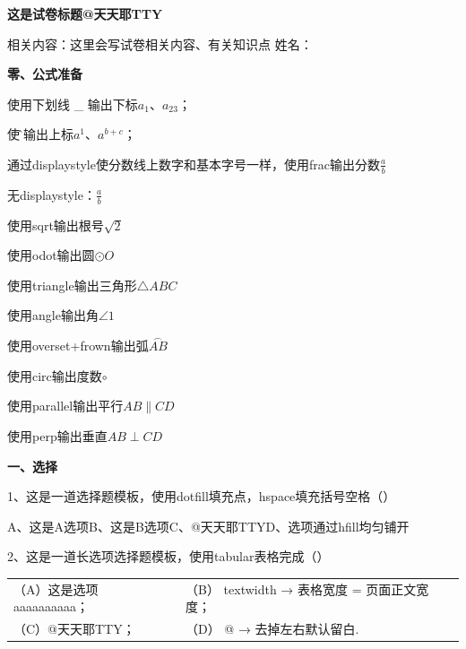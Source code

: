 \documentclass[11pt,oneside,a4paper,UTF8]{ctexart}
\begin{document}

\pagestyle{empty}   %

\begin{center}      %
\textbf{这是试卷标题@天天耶TTY}     %
\end{center}


相关内容：这里会写试卷相关内容、有关知识点 \hfill 姓名：\underline{\hspace{2.5cm}}

\vspace*{1\baselineskip}    %
\textbf{零、公式准备}

使用下划线 \_ 输出下标$a_1$、$a_{23}$；

使\^用输出上标$a^1$、$a^{b+c}$；

通过displaystyle使分数线上数字和基本字号一样，使用frac输出分数$\displaystyle\frac{a}{b}$

无displaystyle：$\frac{a}{b}$

使用sqrt输出根号$\sqrt{2}$

使用odot输出圆$\odot O$

使用triangle输出三角形$\triangle ABC$

使用angle输出角$\angle 1$

使用overset+frown输出弧$\overset{\frown}{AB}$

使用circ输出度数$\circ$

使用parallel输出平行$AB\parallel CD$

使用perp输出垂直$AB\perp CD$
\vspace*{1\baselineskip}    %

\textbf{一、选择}

1、这是一道选择题模板，使用dotfill填充点，hspace填充括号空格\dotfill（\hspace{1.5cm}）

A、这是A选项\hfill B、这是B选项\hfill C、@天天耶TTY\hfill D、选项通过hfill均匀铺开

2、这是一道长选项选择题模板，使用tabular表格完成\dotfill（\hspace{1.5cm}）
\begin{tabular*}{\textwidth}{@{}p{} p{}@{}}     %
（A）这是选项aaaaaaaaaa； & （B） textwidth → 表格宽度 = 页面正文宽度；\\
（C）@天天耶TTY； & （D） @ → 去掉左右默认留白. 
\end{tabular*}
\end{document}
